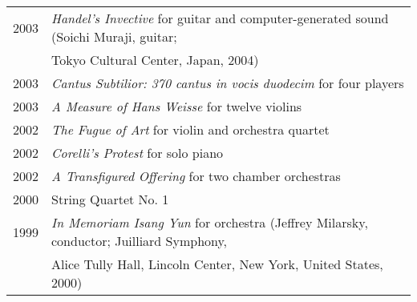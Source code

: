 \documentclass[a4paper,11pt]{article}
\begin{document}
  \hspace*{-0.25cm}
  \begin{tabular}{p{2.5cm} p{12.5cm}}
  2003 & \textit{Handel’s Invective} for guitar and computer-generated sound (Soichi Muraji, guitar;\\
  & Tokyo Cultural Center, Japan, 2004)\\[2mm]
  
  2003 & \textit{Cantus Subtilior: 370 cantus in vocis duodecim} for four players\\[2mm]
  
  2003 & \textit{A Measure of Hans Weisse} for twelve violins\\[2mm]
  
  2002 & \textit{The Fugue of Art} for violin and orchestra quartet\\[2mm]
  
  2002 & \textit{Corelli’s Protest} for solo piano\\[2mm]
  
  2002 & \textit{A Transfigured Offering} for two chamber orchestras\\[2mm]
  
  2000 & String Quartet No. 1\\[2mm]
  
  1999 & \textit{In Memoriam Isang Yun} for orchestra (Jeffrey Milarsky, conductor; Juilliard Symphony,\\
  & Alice Tully Hall, Lincoln Center, New York, United States, 2000)
  \end{tabular}
  
%  
%  
%  
%  
%  
%  
%  
%  
%  
  
\end{document}
